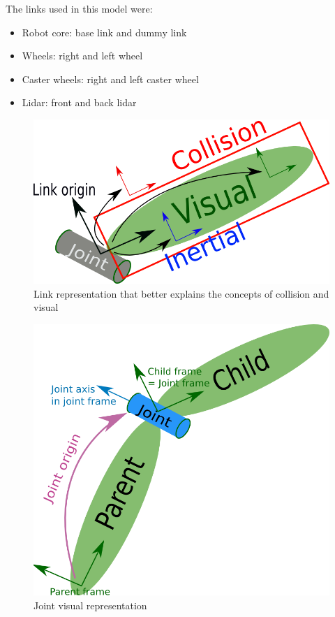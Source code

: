The links used in this model were:
\begin{itemize}
    \item Robot core: base link and dummy link
    \item Wheels: right and left wheel
    \item Caster wheels: right and left caster wheel
    \item Lidar: front and back lidar
\end{itemize}
\begin{figure}[H]
    \centering
    \includegraphics[scale=1.3]{Images/Chapter 5/inertial.png}
    \caption{Link representation that better explains the concepts of collision and visual}
    \label{fig:link}
\end{figure}
\begin{figure}[H]
    \centering
    \includegraphics[scale=0.25]{Images/Chapter 5/joint.png}
    \caption{Joint visual representation}
    \label{fig:joint}
\end{figure}

